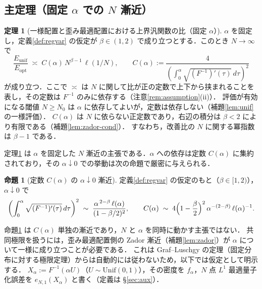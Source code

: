 \documentclass[a4paper,10pt]{jsarticle}
\theoremstyle{definition}
\newtheorem{proposition}{命題}[section]
\newtheorem{theorem}{定理}[section]
\newcommand{\Finv}{F^{-1}}
\newcommand{\eN}{e_{N,1}}
\newcommand{\Eunif}{E_{\mathrm{unif}}}
\newcommand{\Eopt}{E_{\mathrm{opt}}}
\begin{document}
\subsection{主定理（固定 $\alpha$ での $N$ 漸近）}

\begin{theorem}[一様配置と歪み最適配置における上界汎関数の比（固定 $\alpha$）]
\label{thm:alpha}
$\alpha$ を固定し，定義\ref{def:regvar} の仮定が $\beta\in(1,2)$ で成り立つとする．このとき $N\to\infty$ で
\begin{equation}
  \frac{\Eunif}{\Eopt}
  \;\asymp\;C(\alpha)\,N^{\beta-1}\,\ell(1/N),
  \qquad
  C(\alpha):=\frac{4}{\left(\int_0^\alpha\sqrt{(\Finv)'(\tau)}\,d\tau\right)^{2}}
  \label{eq:thm-scaling}
\end{equation}
が成り立つ．ここで $\asymp$ は $N$ に関して比が正の定数で上下から挟まれることを表し，その定数は $\Finv$ のみに依存する（注意\ref{rem:assumption}(ii)）．
評価が有効になる閾値 $N\ge N_0$ は $\alpha$ に依存してよいが，定数は依存しない（補題\ref{lem:unif} の一様評価）．
$C(\alpha)$ は $N$ に依らない正定数であり，右辺の積分は $\beta<2$ により有限である（補題\ref{lem:zador-cond}）．
すなわち，改善比の $N$ に関する冪指数は $\beta-1$ である．
\end{theorem}

定理\ref{thm:alpha} は $\alpha$ を固定した $N$ 漸近の主張である．$\alpha$ への依存は定数 $C(\alpha)$ に集約されており，その $\alpha\downarrow0$ での挙動は次の命題で厳密に与えられる．

\begin{proposition}[定数 $C(\alpha)$ の $\alpha\downarrow0$ 漸近]
\label{prop:alpha}
定義\ref{def:regvar} の仮定のもと（$\beta\in[1,2)$），$\alpha\downarrow0$ で
\begin{equation}
  \left(\int_0^\alpha\sqrt{(\Finv)'(\tau)}\,d\tau\right)^{2}
  \;\sim\;\frac{\alpha^{\,2-\beta}\,\ell(\alpha)}{(1-\beta/2)^{2}},
  \qquad
  C(\alpha)\;\sim\;4\Bigl(1-\frac\beta2\Bigr)^{2}\,\alpha^{-(2-\beta)}\,\ell(\alpha)^{-1}.
  \label{eq:alpha-scaling}
\end{equation}
\end{proposition}

命題\ref{prop:alpha} は $C(\alpha)$ 単独の漸近であり，$N$ と $\alpha$ を同時に動かす主張ではない．
共同極限を扱うには，歪み最適配置側の Zador 漸近（補題\ref{lem:zador}）が $\alpha$ について一様に成り立つことが必要である．
これは Graf--Luschgy の定理（固定分布に対する極限定理）からは自動的には従わないため，以下では仮定として明示する．
$X_\alpha:=\Finv(\alpha U)$（$U\sim\mathrm{Unif}(0,1)$），その密度を $f_\alpha$，$N$ 点 $L^1$ 最適量子化誤差を $\eN(X_\alpha)$ と書く（定義は §\ref{sec:aux}）．
\end{document}
